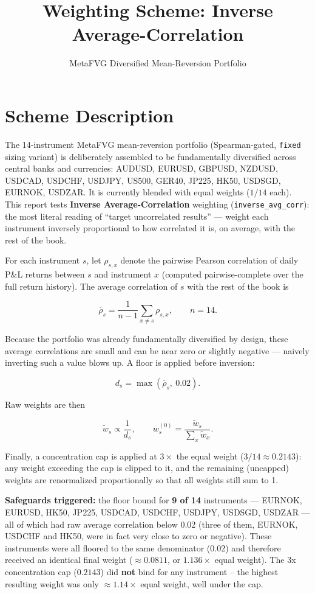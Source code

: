 \documentclass[11pt]{article}
\title{Weighting Scheme: Inverse Average-Correlation}
\author{MetaFVG Diversified Mean-Reversion Portfolio}
\date{}
\begin{document}
\maketitle

\section{Scheme Description}

The 14-instrument MetaFVG mean-reversion portfolio (Spearman-gated, \texttt{fixed} sizing
variant) is deliberately assembled to be fundamentally diversified across central
banks and currencies: AUDUSD, EURUSD, GBPUSD, NZDUSD, USDCAD, USDCHF, USDJPY,
US500, GER40, JP225, HK50, USDSGD, EURNOK, USDZAR. It is currently blended with
equal weights ($1/14$ each). This report tests \textbf{Inverse Average-Correlation}
weighting (\texttt{inverse\_avg\_corr}): the most literal reading of ``target
uncorrelated results'' --- weight each instrument inversely proportional to how
correlated it is, on average, with the rest of the book.

For each instrument $s$, let $\rho_{s,x}$ denote the pairwise Pearson correlation
of daily P\&L returns between $s$ and instrument $x$ (computed pairwise-complete
over the full return history). The average correlation of $s$ with the rest of
the book is

\[
\overline{\rho}_s = \frac{1}{n-1} \sum_{x \neq s} \rho_{s,x}, \qquad n = 14.
\]

Because the portfolio was already fundamentally diversified by design, these
average correlations are small and can be near zero or slightly negative ---
naively inverting such a value blows up. A floor is applied before inversion:

\[
d_s = \max(\overline{\rho}_s,\ 0.02).
\]

Raw weights are then

\[
\tilde{w}_s \propto \frac{1}{d_s}, \qquad
w_s^{(0)} = \frac{\tilde{w}_s}{\sum_x \tilde{w}_x}.
\]

Finally, a concentration cap is applied at $3\times$ the equal weight
($3/14 \approx 0.2143$): any weight exceeding the cap is clipped to it, and the
remaining (uncapped) weights are renormalized proportionally so that all weights
still sum to 1.

\textbf{Safeguards triggered:} the floor bound for \textbf{9 of 14} instruments ---
EURNOK, EURUSD, HK50, JP225, USDCAD, USDCHF, USDJPY, USDSGD, USDZAR --- all of
which had raw average correlation below 0.02 (three of them, EURNOK, USDCHF and
HK50, were in fact very close to zero or negative). These instruments were all
floored to the same denominator (0.02) and therefore received an identical final
weight ($\approx 0.0811$, or $1.136\times$ equal weight). The 3x concentration
cap ($0.2143$) did \textbf{not} bind for any instrument -- the highest resulting
weight was only $\approx 1.14\times$ equal weight, well under the cap.
\end{document}
